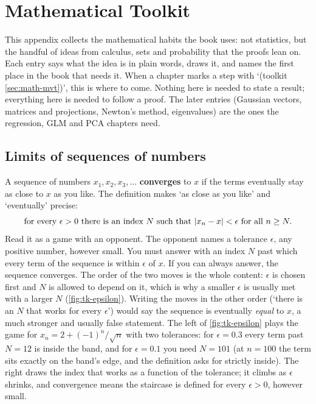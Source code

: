 \chapter{Mathematical Toolkit}
\label{app:math}

This appendix collects the mathematical habits the book uses: not statistics, but the handful of ideas from calculus, sets and probability that the proofs lean on.
Each entry says what the idea is in plain words, draws it, and names the first place in the book that needs it.
When a chapter marks a step with `(toolkit \ref{sec:math-mvt})', this is where to come.
Nothing here is needed to state a result; everything here is needed to follow a proof.
The later entries (Gaussian vectors, matrices and projections, Newton's method, eigenvalues) are the ones the regression, GLM and PCA chapters need.

\section{Limits of sequences of numbers}
\label{sec:math-limits}

A sequence of numbers $x_1, x_2, x_3, \ldots$ \textbf{converges} to $x$ if the terms eventually stay as close to $x$ as you like.
The definition makes `as close as you like' and `eventually' precise:
\[
\text{for every } \epsilon > 0 \text{ there is an index } N \text{ such that } \lvert x_n - x\rvert < \epsilon \text{ for all } n \geq N.
\]
Read it as a game with an opponent.
The opponent names a tolerance $\epsilon$, any positive number, however small.
You must answer with an index $N$ past which every term of the sequence is within $\epsilon$ of $x$.
If you can always answer, the sequence converges.
The order of the two moves is the whole content: $\epsilon$ is chosen first and $N$ is allowed to depend on it, which is why a smaller $\epsilon$ is usually met with a larger $N$ (\cref{fig:tk-epsilon}).
Writing the moves in the other order (`there is an $N$ that works for every $\epsilon$') would say the sequence is eventually \textit{equal} to $x$, a much stronger and usually false statement.
The left of \cref{fig:tk-epsilon} plays the game for $x_n = 2 + (-1)^n/\sqrt{n}$ with two tolerances: for $\epsilon = 0.3$ every term past $N = 12$ is inside the band, and for $\epsilon = 0.1$ you need $N = 101$ (at $n = 100$ the term sits exactly on the band's edge, and the definition asks for strictly inside).
The right draws the index that works as a function of the tolerance; it climbs as $\epsilon$ shrinks, and convergence means the staircase is defined for every $\epsilon > 0$, however small.

